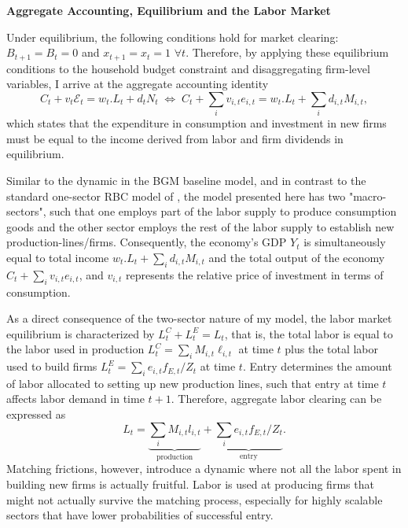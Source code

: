 \documentclass[a4paper,12pt]{article} %
\numberwithin{equation}{section} %
\numberwithin{figure}{section}
\numberwithin{table}{section}
\begin{document}
\medskip
\medskip
\noindent\textbf{Aggregate Accounting, Equilibrium and the Labor Market}
\medskip

Under equilibrium, the following conditions hold for market clearing: $B_{t+1} = B_t=0$ and $x_{t+1}=x_t=1$ $\forall t$. Therefore, by applying these
equilibrium conditions to the household budget constraint and disaggregating firm-level variables, I arrive at the aggregate accounting identity
\begin{equation}
C_t + v_t\mathcal{E}_t= w_t.L_t + d_tN_t \;\Leftrightarrow\;C_t + \sum_iv_{i,t}e_{i,t}= w_t.L_t + \sum_id_{i,t}M_{i,t}, \label{eq:aggaccount}
\end{equation}
which states that the expenditure in consumption and investment in new firms must be equal to the income derived from labor and 
firm dividends in equilibrium.

Similar to the dynamic in the BGM baseline model, and in contrast to the standard one-sector RBC model of \textcite{campbell1994inspecting}, 
the model presented here has two "macro-sectors", such that one employs part of the labor supply to produce consumption goods and the other
sector employs the rest of the labor supply to establish new production-lines/firms. Consequently, the economy's GDP $Y_t$ is simultaneously
equal to total income $w_t.L_t + \sum_id_{i,t}M_{i,t}$ and the total output of the economy $C_t + \sum_iv_{i,t}e_{i,t}$, and $v_{i,t}$ represents 
the relative price of investment in terms of consumption.

As a direct consequence of the two-sector nature of my model, the labor market equilibrium is characterized by $L^C_t+L^E_t = L_t$, that is, 
the total labor is equal to the labor used in production $L^C_t = \sum_iM_{i,t}\ell_{i,t}$ at time $t$ plus the total labor 
used to build firms $L^E_t = \sum_ie_{i,t} f_{E,t}/Z_t$ at time $t$. Entry determines the amount of labor allocated to setting 
up new production lines, such that entry at time $t$ affects labor demand in time $t+1$. Therefore, aggregate labor clearing can be expressed as
\begin{equation}
 L_t = \underbrace{\sum_i M_{i,t}l_{i,t}}_{\text{production}} + \underbrace{\sum_i e_{i,t}f_{E,t}/Z_t}_{\text{entry}}.\label{eq:AgglabourClearing}
\end{equation}
Matching frictions, however, introduce a dynamic where not all the labor spent in building new firms is actually fruitful. 
Labor is used at producing firms that might not actually survive the matching
process, especially for highly scalable sectors that have lower probabilities of successful entry.
\end{document}
